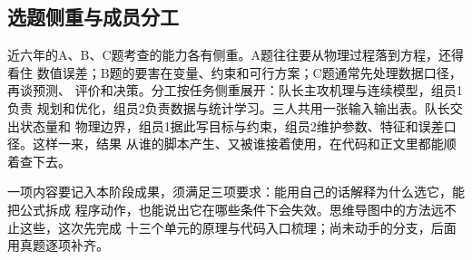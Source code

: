\subsection{选题侧重与成员分工}

近六年的A、B、C题考查的能力各有侧重。A题往往要从物理过程落到方程，还得看住
数值误差；B题的要害在变量、约束和可行方案；C题通常先处理数据口径，再谈预测、
评价和决策。分工按任务侧重展开：队长主攻机理与连续模型，组员1负责
规划和优化，组员2负责数据与统计学习。三人共用一张输入输出表。队长交出状态量和
物理边界，组员1据此写目标与约束，组员2维护参数、特征和误差口径。这样一来，结果
从谁的脚本产生、又被谁接着使用，在代码和正文里都能顺着查下去。

一项内容要记入本阶段成果，须满足三项要求：能用自己的话解释为什么选它，能把公式拆成
程序动作，也能说出它在哪些条件下会失效。思维导图中的方法远不止这些，这次先完成
十三个单元的原理与代码入口梳理；尚未动手的分支，后面用真题逐项补齐。


